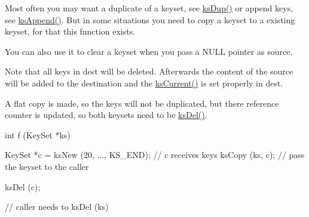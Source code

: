 Most often you may want a duplicate of a keyset, see \hyperlink{group__keyset_gac59e4b328245463f1451f68d5106151c}{ksDup()} or append keys, see \hyperlink{group__keyset_ga21eb9c3a14a604ee3a8bdc779232e7b7}{ksAppend()}. But in some situations you need to copy a keyset to a existing keyset, for that this function exists.

You can also use it to clear a keyset when you pass a NULL pointer as {\ttfamily source}.

Note that all keys in {\ttfamily dest} will be deleted. Afterwards the content of the source will be added to the destination and the \hyperlink{group__keyset_ga4287b9416912c5f2ab9c195cb74fb094}{ksCurrent()} is set properly in {\ttfamily dest}.

A flat copy is made, so the keys will not be duplicated, but there reference counter is updated, so both keysets need to be \hyperlink{group__keyset_ga27e5c16473b02a422238c8d970db7ac8}{ksDel()}.


\begin{DoxyCode}
int f (KeySet *ks)
{
        KeySet *c = ksNew (20, ..., KS_END);
        // c receives keys
        ksCopy (ks, c); // pass the keyset to the caller

        ksDel (c);
}       // caller needs to ksDel (ks)
\end{DoxyCode}




